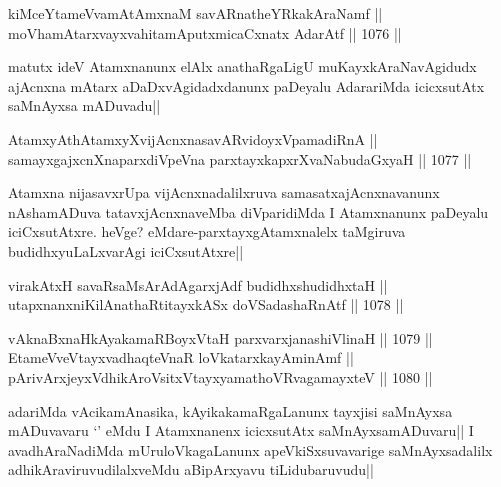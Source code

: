
\begin{shl}
kiMceYtameVvamAtAmxnaM savARnatheYRkakAraNamf || \\
moVhamAtarxvayxvahitamAputxmicaCxnatx AdarAtf ||  1076 ||  
\end{shl}

\begin{artha}
matutx ideV Atamxnanunx elAlx anathaRgaLigU muKayxkAraNavAgidudx ajAcnxna mAtarx aDaDxvAgidadxdanunx paDeyalu AdarariMda icicxsutAtx saMnAyxsa mADuvadu||
\end{artha}


\begin{shl}
AtamxyAthAtamxyXvijAcnxnasavARvidoyxVpamadiRnA || \\
samayxgajxcnXnaparxdiVpeVna parxtayxkapxrXvaNabudaGxyaH ||  1077 ||  
\end{shl}

\begin{artha}
Atamxna nijasavxrUpa vijAcnxnadalilxruva samasatxajAcnxnavanunx nAshamADuva tatavxjAcnxnaveMba diVparidiMda I Atamxnanunx paDeyalu iciCxsutAtxre. heVge? eMdare-parxtayxgAtamxnalelx taMgiruva budidhxyuLaLxvarAgi iciCxsutAtxre||
\end{artha}

\begin{shl}
virakAtxH savaRsaMsArAdAgarxjAdf budidhxshudidhxtaH || \\
utapxnanxniKilAnathaRtitayxkASx doVSadashaRnAtf ||  1078 ||  
\end{shl}
				
\begin{shl}
vAknaBxnaHkAyakamaRBoyxV\s taH parxvarxjanashiVlinaH ||  1079 ||  \\
EtameVveVtayxvadhaqteVnaR loVkatarxkayAminAmf || \\
pArivArxjeyxV\s dhikAroV\s sitxVtayxyamathoVR\s vagamayxteV ||  1080 ||  
\end{shl}

\begin{artha}
adariMda vAcikamAnasika, kAyikakamaRgaLanunx tayxjisi saMnAyxsa mADuvavaru `\stext' eMdu I Atamxnanenx icicxsutAtx saMnAyxsamADuvaru|| I avadhAraNadiMda mUruloVkagaLanunx apeVkiSxsuvavarige saMnAyxsadalilx adhikAraviruvudilalxveMdu aBipArxyavu tiLidubaruvudu||
\end{artha}

